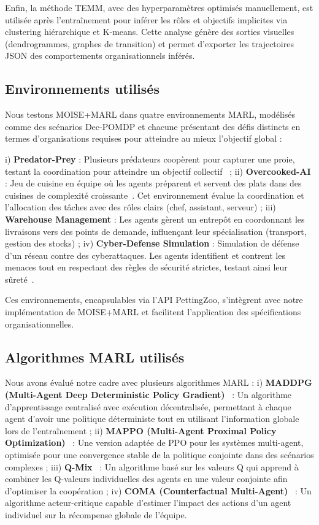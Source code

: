 \documentclass[francais,ROIA,Unicode,manuscript]{cedram}
\begin{document}
Enfin, la méthode TEMM, avec des hyperparamètres optimisés manuellement, est utilisée après l'entraînement pour inférer les rôles et objectifs implicites via clustering hiérarchique et K-means. Cette analyse génère des sorties visuelles (dendrogrammes, graphes de transition) et permet d'exporter les trajectoires JSON des comportements organisationnels inférés.

\subsection{Environnements utilisés}

Nous testons MOISE+MARL dans quatre environnements MARL, modélisés comme des scénarios Dec-POMDP et chacune présentant des défis distincts en termes d'organisations requises pour atteindre au mieux l'objectif global :

i) \textbf{Predator-Prey} : Plusieurs prédateurs coopèrent pour capturer une proie, testant la coordination pour atteindre un objectif collectif~\cite{lowe2017multi}
; \quad
ii) \textbf{Overcooked-AI} : Jeu de cuisine en équipe où les agents préparent et servent des plats dans des cuisines de complexité croissante~\cite{overcookedai}. Cet environnement évalue la coordination et l'allocation des tâches avec des rôles clairs (chef, assistant, serveur)
; \quad
iii) \textbf{Warehouse Management} : Les agents gèrent un entrepôt en coordonnant les livraisons vers des points de demande, influençant leur spécialisation (transport, gestion des stocks)
; \quad
iv) \textbf{Cyber-Defense Simulation} : Simulation de défense d'un réseau contre des cyberattaques. Les agents identifient et contrent les menaces tout en respectant des règles de sécurité strictes, testant ainsi leur sûreté~\cite{Maxwell2021}.

Ces environnements, encapsulables via l'API PettingZoo, s'intègrent avec notre implémentation de MOISE+MARL et facilitent l'application des spécifications organisationnelles.

\subsection{Algorithmes MARL utilisés}

Nous avons évalué notre cadre avec plusieurs algorithmes MARL :
i) \textbf{MADDPG (Multi-Agent Deep Deterministic Policy Gradient)}~\cite{lowe2017multi} : Un algorithme d'apprentissage centralisé avec exécution décentralisée, permettant à chaque agent d'avoir une politique déterministe tout en utilisant l'information globale lors de l'entraînement
; \quad
ii) \textbf{MAPPO (Multi-Agent Proximal Policy Optimization)}~\cite{yu2021mappo} : Une version adaptée de PPO pour les systèmes multi-agent, optimisée pour une convergence stable de la politique conjointe dans des scénarios complexes
; \quad
iii) \textbf{Q-Mix}~\cite{rashid2018qmix} : Un algorithme basé sur les valeurs Q qui apprend à combiner les Q-valeurs individuelles des agents en une valeur conjointe afin d'optimiser la coopération
; \quad
iv) \textbf{COMA (Counterfactual Multi-Agent)}~\cite{foerster2018counterfactual} : Un algorithme acteur-critique capable d'estimer l'impact des actions d'un agent individuel sur la récompense globale de l'équipe.
\end{document}
